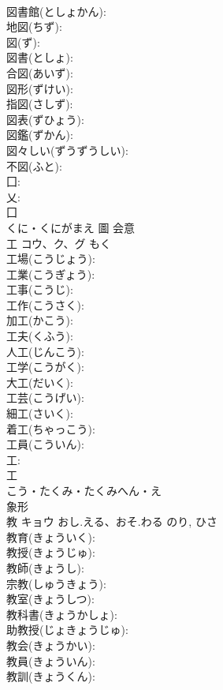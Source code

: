 \documentclass[8pt]{extreport}
\begin{document}
\begin{CJK}{UTF8}{min}
\\	図書館(としょかん): 
\\	地図(ちず): 
\\	図(ず): 
\\	図書(としょ): 
\\	合図(あいず): 
\\	図形(ずけい): 
\\	指図(さしず): 
\\	図表(ずひょう): 
\\	図鑑(ずかん): 
\\	図々しい(ずうずうしい): 
\\	不図(ふと): 
\\	囗: 
\\	乂: 
\\	囗	
\\	くに・くにがまえ	圖	会意 
\\	工	コウ、ク、グ		もく	
\\	工場(こうじょう): 
\\	工業(こうぎょう): 
\\	工事(こうじ): 
\\	工作(こうさく): 
\\	加工(かこう): 
\\	工夫(くふう): 
\\	人工(じんこう): 
\\	工学(こうがく): 
\\	大工(だいく): 
\\	工芸(こうげい): 
\\	細工(さいく): 
\\	着工(ちゃっこう): 
\\	工員(こういん): 
\\	工: 
\\	工	
\\	こう・たくみ・たくみへん・え	
\\	象形 
\\	教	キョウ	おし.える、おそ.わる	のり, ひさ	
\\	教育(きょういく): 
\\	教授(きょうじゅ): 
\\	教師(きょうし): 
\\	宗教(しゅうきょう): 
\\	教室(きょうしつ): 
\\	教科書(きょうかしょ): 
\\	助教授(じょきょうじゅ): 
\\	教会(きょうかい): 
\\	教員(きょういん): 
\\	教訓(きょうくん): 

\end{CJK}
\end{document}
